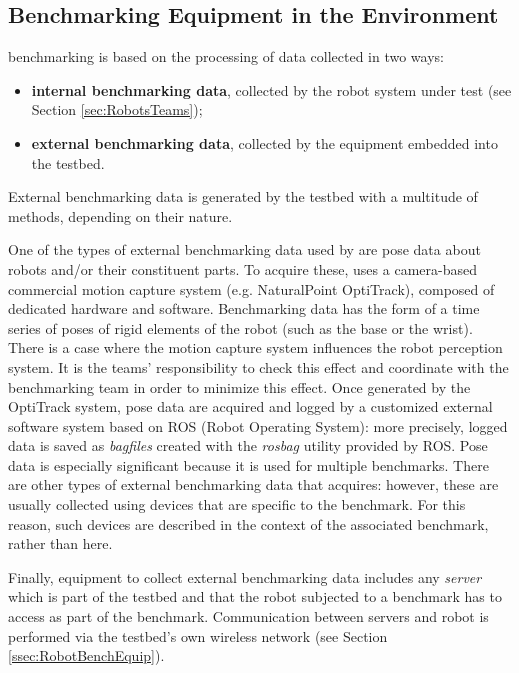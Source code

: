 
\subsection{Benchmarking Equipment in the Environment}
\label{ssec:BenchmarkingEquipment}

\erlir benchmarking is based on the processing of data collected in two ways:
\begin{itemize}
\item \textbf{internal benchmarking data}, collected by the robot system 
	under test (see Section \ref{sec:RobotsTeams});
\item \textbf{external benchmarking data}, collected by the equipment 
	embedded into the testbed.
\end{itemize}
External benchmarking data is generated by the \erlir testbed with a multitude of methods, depending on their nature.

One of the types of external benchmarking data used by \erlir are pose data about robots and/or their constituent parts. To acquire these, \erlir uses a camera-based commercial motion capture system (e.g. NaturalPoint OptiTrack), composed of dedicated hardware and software. Benchmarking data has the form of a time series of poses of rigid elements of the robot (such as the base or the wrist). There is a case where the motion capture system influences the robot perception system. It is the teams' responsibility to check this effect and coordinate with the benchmarking team in order to minimize this effect. Once generated by the OptiTrack system, pose data are acquired and logged by a customized external software system based on ROS (Robot Operating System): more precisely, logged data is saved as \emph{bagfiles} created with the \emph{rosbag} utility provided by ROS. Pose data is especially significant because it is used for multiple benchmarks. There are other types of external benchmarking data that \erlir acquires: however, these are usually collected using devices that are specific to the benchmark. For this reason, such devices are described in the context of the associated benchmark, rather than here. 

Finally, equipment to collect external benchmarking data includes any \emph{server} which is part of the testbed and that the robot subjected to a benchmark has to access as part of the benchmark. Communication between servers and robot is performed via the testbed's own wireless network (see Section \ref{ssec:RobotBenchEquip}).

